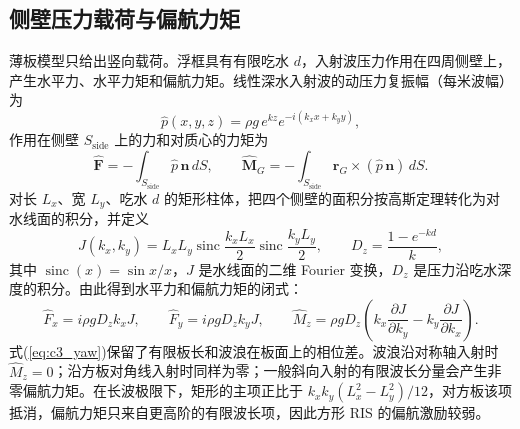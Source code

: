 \subsection{侧壁压力载荷与偏航力矩}

薄板模型只给出竖向载荷。浮框具有有限吃水 $d$，入射波压力作用在四周侧壁上，产生水平力、水平力矩和偏航力矩。线性深水入射波的动压力复振幅（每米波幅）为
\begin{equation}
\hat p(x,y,z)=\rho g\,e^{kz}e^{-i(k_xx+k_yy)},
\label{eq:c3_pressure}
\end{equation}
作用在侧壁 $S_{\mathrm{side}}$ 上的力和对质心的力矩为
\begin{equation}
\hat{\mathbf F}=-\int_{S_{\mathrm{side}}}\hat p\,\mathbf n\,dS,\qquad
\hat{\mathbf M}_G=-\int_{S_{\mathrm{side}}}\mathbf r_G\times(\hat p\,\mathbf n)\,dS.
\label{eq:c3_side_int}
\end{equation}
对长 $L_x$、宽 $L_y$、吃水 $d$ 的矩形柱体，把四个侧壁的面积分按高斯定理转化为对水线面的积分，并定义
\begin{equation}
J(k_x,k_y)=L_xL_y\operatorname{sinc}\frac{k_xL_x}{2}\operatorname{sinc}\frac{k_yL_y}{2},\qquad
D_z=\frac{1-e^{-kd}}{k},
\label{eq:c3_J}
\end{equation}
其中 $\operatorname{sinc}(x)=\sin x/x$，$J$ 是水线面的二维 Fourier 变换，$D_z$ 是压力沿吃水深度的积分。由此得到水平力和偏航力矩的闭式：
\begin{equation}
\hat F_x=i\rho gD_zk_xJ,\qquad
\hat F_y=i\rho gD_zk_yJ,\qquad
\hat M_z=\rho gD_z\left(k_x\frac{\partial J}{\partial k_y}-k_y\frac{\partial J}{\partial k_x}\right).
\label{eq:c3_yaw}
\end{equation}
式(\ref{eq:c3_yaw})保留了有限板长和波浪在板面上的相位差。波浪沿对称轴入射时 $\hat M_z=0$；沿方板对角线入射时同样为零；一般斜向入射的有限波长分量会产生非零偏航力矩。在长波极限下，矩形的主项正比于 $k_xk_y(L_x^2-L_y^2)/12$，对方板该项抵消，偏航力矩只来自更高阶的有限波长项，因此方形 RIS 的偏航激励较弱。


